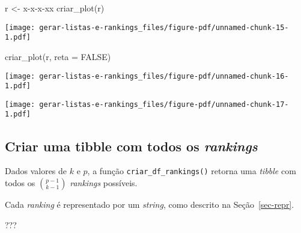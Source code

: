 \documentclass[
  letterpaper,
  DIV=11,
  numbers=noendperiod]{scrreprt}
\newenvironment{Shaded}{\begin{snugshade}}{\end{snugshade}}
\newcommand{\AttributeTok}[1]{\textcolor[rgb]{0.40,0.45,0.13}{#1}}
\newcommand{\ConstantTok}[1]{\textcolor[rgb]{0.56,0.35,0.01}{#1}}
\newcommand{\DecValTok}[1]{\textcolor[rgb]{0.68,0.00,0.00}{#1}}
\newcommand{\FunctionTok}[1]{\textcolor[rgb]{0.28,0.35,0.67}{#1}}
\newcommand{\NormalTok}[1]{\textcolor[rgb]{0.00,0.23,0.31}{#1}}
\newcommand{\OtherTok}[1]{\textcolor[rgb]{0.00,0.23,0.31}{#1}}
\newcommand{\SpecialCharTok}[1]{\textcolor[rgb]{0.37,0.37,0.37}{#1}}
\newcommand{\StringTok}[1]{\textcolor[rgb]{0.13,0.47,0.30}{#1}}
\begin{document}
\begin{Shaded}
\begin{Highlighting}[]
\NormalTok{r }\OtherTok{\textless{}{-}} \StringTok{\textquotesingle{}x{-}x{-}x{-}xx\textquotesingle{}}
\FunctionTok{criar\_plot}\NormalTok{(r)}
\end{Highlighting}
\end{Shaded}

\begin{center}
\texttt{[image: gerar-listas-e-rankings\_files/figure-pdf/unnamed-chunk-15-1.pdf]}
\end{center}

\begin{Shaded}
\begin{Highlighting}[]
\FunctionTok{criar\_plot}\NormalTok{(r, }\AttributeTok{reta =} \ConstantTok{FALSE}\NormalTok{)}
\end{Highlighting}
\end{Shaded}

\begin{center}
\texttt{[image: gerar-listas-e-rankings\_files/figure-pdf/unnamed-chunk-16-1.pdf]}
\end{center}

\begin{Shaded}
\end{Shaded}

\begin{center}
\texttt{[image: gerar-listas-e-rankings\_files/figure-pdf/unnamed-chunk-17-1.pdf]}
\end{center}

\subsection{\texorpdfstring{Criar uma tibble com todos os
\emph{rankings}}{Criar uma tibble com todos os rankings}}\label{criar-uma-tibble-com-todos-os-rankings}

Dados valores de $k$ e $p$, a função \texttt{criar\_df\_rankings()}
retorna uma \emph{tibble} com todos os $\binom{p - 1}{k - 1}$
\emph{rankings} possíveis.

Cada \emph{ranking} é representado por um \emph{string}, como descrito
na Seção~\ref{sec-repr}.

???
\end{document}
